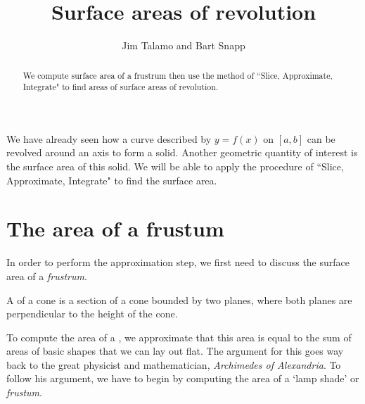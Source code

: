 \documentclass{ximera}
\author{Jim Talamo and Bart Snapp}
\title[Dig-In:]{Surface areas of revolution}
\begin{document}
\begin{abstract}
We compute surface area of a frustrum then use the method of ``Slice, Approximate, Integrate" to find areas of surface areas of revolution.
\end{abstract}
\maketitle


We have already seen how a curve described by $y=f(x)$ on $[a,b]$ can be revolved around an axis to form a solid. Another geometric quantity of interest is the surface area of this solid.  We will be able to apply the procedure of ``Slice, Approximate, Integrate" to find the surface area. 
\section{The area of a frustum}
 In order to perform the approximation step, we first need to discuss the surface area of a \emph{frustrum}.

\begin{definition}
  A  of a cone is a section of a cone bounded by two
  planes, where both planes are perpendicular to the height of the
  cone.


To compute the area of a , we approximate that this area is equal to the sum of areas of basic shapes  that we can lay out flat. The argument for this goes way back to the great physicist and mathematician, \textit{Archimedes of Alexandria}. To follow his argument, we have to begin by computing the area of a `lamp shade' or \textit{frustum}.

  \begin{image}[1in]
  \end{image}
\end{definition}
\end{document}
